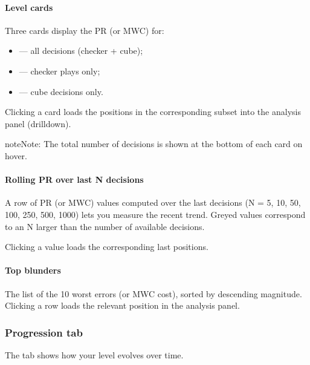 \documentclass[letterpaper,10pt,english]{sphinxmanual}
\begin{document}
\paragraph{Level cards}
\label{\detokenize{manuel:cartes-de-niveau}}
\sphinxAtStartPar
Three cards display the PR (or MWC) for:
\begin{itemize}
\item {} 
\sphinxAtStartPar
{} — all decisions (checker + cube);

\item {} 
\sphinxAtStartPar
{} — checker plays only;

\item {} 
\sphinxAtStartPar
{} — cube decisions only.

\end{itemize}

\sphinxAtStartPar
Clicking a card loads the positions in the corresponding subset into the analysis panel (drill\sphinxhyphen{}down).

\begin{sphinxadmonition}{note}{Note:}
\sphinxAtStartPar
The total number of decisions is shown at the bottom of each card on hover.
\end{sphinxadmonition}


\paragraph{Rolling PR over last N decisions}
\label{\detokenize{manuel:pr-glissant-sur-n-dernieres-decisions}}
\sphinxAtStartPar
A row of PR (or MWC) values computed over the last  decisions (N = 5, 10, 50, 100, 250, 500, 1000) lets you measure the recent trend. Greyed values correspond to an N larger than the number of available decisions.

\sphinxAtStartPar
Clicking a value loads the corresponding last  positions.


\paragraph{Top blunders}
\label{\detokenize{manuel:top-blunders}}
\sphinxAtStartPar
The list of the 10 worst errors (or MWC cost), sorted by descending magnitude. Clicking a row loads the relevant position in the analysis panel.


\subsubsection{Progression tab}
\label{\detokenize{manuel:onglet-progression}}
\sphinxAtStartPar
The  tab shows how your level evolves over time.
\end{document}
